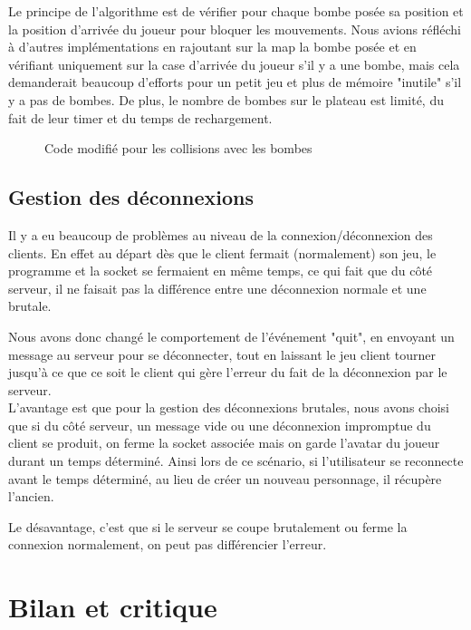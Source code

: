 \documentclass[a4paper]{article}
\begin{document}
		Le principe de l'algorithme est de vérifier pour chaque bombe posée sa position et la position d'arrivée du joueur pour bloquer les mouvements. Nous avions réfléchi à d'autres implémentations en rajoutant sur la map la bombe posée et en vérifiant uniquement sur la case d'arrivée du joueur s'il y a une bombe, mais cela demanderait beaucoup d'efforts pour un petit jeu et plus de mémoire "inutile" s'il y a pas de bombes. De plus, le nombre de bombes sur le plateau est limité, du fait de leur timer et du temps de rechargement.
\newpage

\begin{figure}[!htbp]
	\centering
	
	\caption{Code modifié pour les collisions avec les bombes}
	\label{shema/codecolliders}
\end{figure}
		
\newpage

		\subsection{Gestion des déconnexions}

		Il y a eu beaucoup de problèmes au niveau de la connexion/déconnexion des clients. En effet au départ dès que le client fermait (normalement) son jeu, le programme et la socket se fermaient en même temps, ce qui fait que du côté serveur, il ne faisait pas la différence entre une déconnexion normale et une brutale.

		Nous avons donc changé le comportement de l'événement "quit", en envoyant un message au serveur pour se déconnecter, tout en laissant le jeu client tourner jusqu'à ce que ce soit le client qui gère l'erreur du fait de la déconnexion par le serveur.
		\\

		L'avantage est que pour la gestion des déconnexions brutales, nous avons choisi que si du côté serveur, un message vide ou une déconnexion impromptue du client se produit, on ferme la socket associée mais on garde l'avatar du joueur durant un temps déterminé. Ainsi lors de ce scénario, si l'utilisateur se reconnecte avant le temps déterminé, au lieu de créer un nouveau personnage, il récupère l'ancien.

		Le désavantage, c'est que si le serveur se coupe brutalement ou ferme la connexion normalement, on peut pas différencier l'erreur.


	\section{Bilan et critique}
\end{document}
